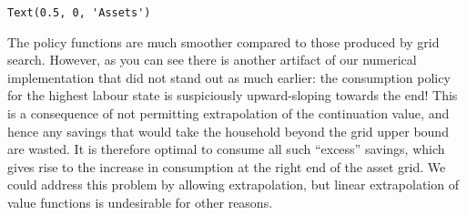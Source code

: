 \documentclass{scrartcl}
\makeatletter
\newcommand{\boxspacing}{\kern\kvtcb@left@rule\kern\kvtcb@boxsep}
\newcommand{\prompt}[4]{
        {\ttfamily\llap{{\color{#2}[#3]:\hspace{3pt}#4}}\vspace{-\baselineskip}}
    }
\makeatother
\begin{document}
            \begin{tcolorbox}[breakable, size=fbox, boxrule=.5pt, pad at break*=1mm, opacityfill=0]
\prompt{Out}{outcolor}{23}{\boxspacing}
\begin{Verbatim}[commandchars=\\\{\}]
Text(0.5, 0, 'Assets')
\end{Verbatim}
\end{tcolorbox}
        
    \begin{center}
    \end{center}
    
    The policy functions are much smoother compared to those produced by
grid search. However, as you can see there is another artifact of our
numerical implementation that did not stand out as much earlier: the
consumption policy for the highest labour state is suspiciously
upward-sloping towards the end! This is a consequence of not permitting
extrapolation of the continuation value, and hence any savings that
would take the household beyond the grid upper bound are wasted. It is
therefore optimal to consume all such ``excess'' savings, which gives
rise to the increase in consumption at the right end of the asset grid.
We could address this problem by allowing extrapolation, but linear
extrapolation of value functions is undesirable for other reasons.


    
    
    
\end{document}
